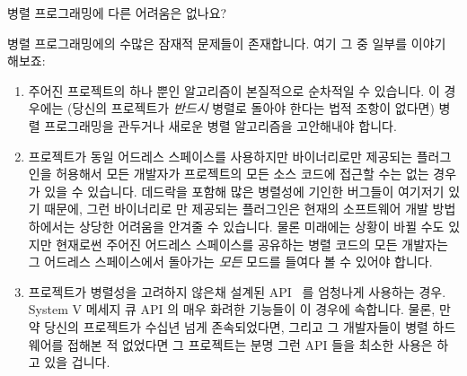 \QuickQ{}
	병렬 프로그래밍에 다른 어려움은 없나요?

\QuickA{}
	병렬 프로그래밍에의 수많은 잠재적 문제들이 존재합니다.
	여기 그 중 일부를 이야기 해보죠:

	\begin{enumerate}
	\item	주어진 프로젝트의 하나 뿐인 알고리즘이 본질적으로 순차적일 수
		있습니다.
		이 경우에는 (당신의 프로젝트가 \emph{반드시} 병렬로 돌아야
		한다는 법적 조항이 없다면) 병렬 프로그래밍을 관두거나 새로운
		병렬 알고리즘을 고안해내야 합니다.

	\item	프로젝트가 동일 어드레스 스페이스를 사용하지만 바이너리로만
		제공되는 플러그인을 허용해서 모든 개발자가 프로젝트의 모든 소스
		코드에 접근할 수는 없는 경우가 있을 수 있습니다.
		데드락을 포함해 많은 병렬성에 기인한 버그들이 여기저기 있기
		때문에, 그런 바이너리로 만 제공되는 플러그인은 현재의
		소프트웨어 개발 방법 하에서는 상당한 어려움을 안겨줄 수
		있습니다.
		물론 미래에는 상황이 바뀔 수도 있지만 현재로썬 주어진 어드레스
		스페이스를 공유하는 병렬 코드의 모든 개발자는 그 어드레스
		스페이스에서 돌아가는 \emph{모든} 모드를 들여다 볼 수 있어야
		합니다.

	\item	프로젝트가 병렬성을 고려하지 않은채 설계된
		API~\cite{HagitAttiya2011LawsOfOrder,Clements:2013:SCR:2517349.2522712}
		를 엄청나게 사용하는 경우.
		System V 메세지 큐 API 의 매우 화려한 기능들이 이 경우에
		속합니다.
		물론, 만약 당신의 프로젝트가 수십년 넘게 존속되었다면, 그리고
		그 개발자들이 병렬 하드웨어를 접해본 적 없었다면 그 프로젝트는
		분명 그런 API 들을 최소한 사용은 하고 있을 겁니다.


\end{enumerate}
